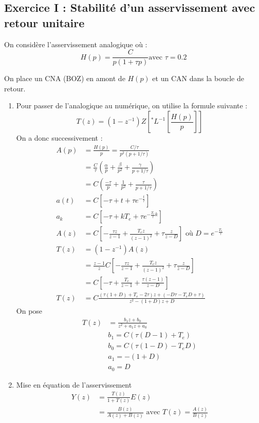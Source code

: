 \documentclass[../main.tex]{subfiles}
\begin{document}
\subsection*{Exercice I : Stabilité d'un asservissement avec retour unitaire}

On considère l'asservissement analogique où :
\[ H(p) = \frac{C}{p(1+\tau p)} \text{avec } \tau = 0.2 \]

On place un CNA (BOZ) en amont de $H(p)$ et un CAN dans la boucle de retour.
\begin{enumerate}
\item Pour passer de l'analogique au numérique, on utilise la formule suivante :
\[ T(z) = (1-z^{-1})Z[^*L^{-1}[\frac{H(p)}{p}]] \]
On a donc successivement :
\begin{align*}
A(p) & = \frac{H(p)}{p}  = \frac{C/\tau}{p^2(p+1/\tau)} \\
& = \frac{C}{\tau}(\frac{\alpha}{p} + \frac{\beta}{p^2} + \frac{\gamma}{p+1/\tau}) \\
& = C (\frac{-\tau}{p} + \frac{1}{p^2} + \frac{\tau}{p+1/\tau}) \\
a(t) & = C[-\tau+t+\tau e^{-\frac{t}{\tau}}] \\
a_k & = C[-\tau + kT_e + \tau e^{-\frac{T_e}{\tau}k}] \\
A(z) & = C[ -\frac{\tau z}{z-1} + \frac{T_e z}{(z-1)^2} + \tau\frac{z}{z-D} ] \text{ où } D = e^{-\frac{T_e}{\tau}} \\
T(z) & = (1-z^{-1})A(z) \\
& = \frac{z-1}{z} C[ -\frac{\tau z}{z-1} + \frac{T_e z}{(z-1)^2} + \tau\frac{z}{z-D}] \\
& = C[ -\tau + \frac{T_e}{z-1} + \frac{\tau(z-1)}{z-D} ] \\
T(z) & = C \frac{(\tau(1+D)+T_e-2\tau)z + (-D\tau - T_e D + \tau)}{z^2 - (1+D)z + D}
\end{align*}
On pose
\begin{align*}
T(z) & = \frac{b_1 z + b_0}{z^2 + a_1 z + a_0} \\
& b_1 = C(\tau(D-1) + T_e)\\
& b_0 = C(\tau(1-D) - T_e D)\\
& a_1 = -(1+D)\\
& a_0 =D
\end{align*}

\item Mise en équation de l'asservissement
\begin{align*}
Y(z) & = \frac{T(z)}{1+T(z)} E(z) \\
& = \frac{B(z)}{A(z) + B(z)} \text{ avec } T(z) = \frac{A(z)}{B(z)}
\end{align*}


\end{enumerate}
\end{document}
